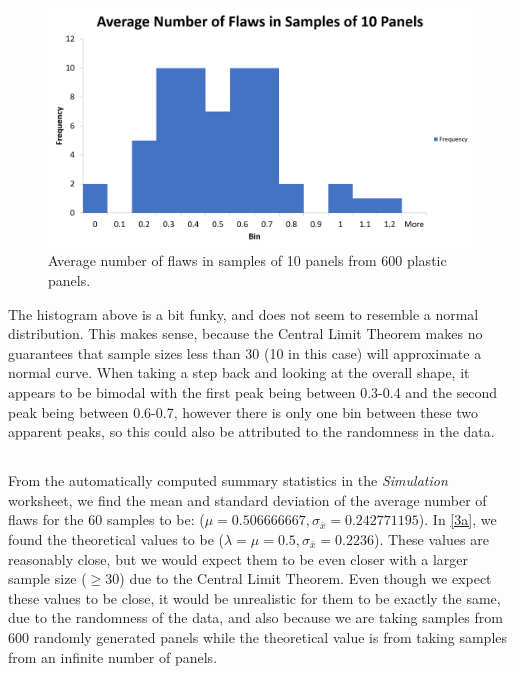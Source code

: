 \documentclass[letterpaper]{article}
\begin{document}
\subsection{}%
\label{4c}
\begin{figure}[H]
 \centering
 \includegraphics[width=\textwidth]{q4.png}
 \caption{Average number of flaws in samples of 10 panels from 600 plastic panels.}
 
\end{figure}

The histogram above is a bit funky, and does not seem to resemble a normal
distribution.  This makes sense, because the Central Limit Theorem makes no
guarantees that sample sizes less than 30  (10 in this case) will approximate a
normal curve. When taking a step back and looking at the overall shape, it
appears to be bimodal with the first peak being between 0.3-0.4 and the second
peak being between 0.6-0.7, however there is only one bin between these two
apparent peaks, so this could also be attributed to the randomness in the data.

\subsection{}%

\label{4d}
From the automatically computed summary statistics in the \textit{Simulation}
worksheet, we find the mean and standard deviation of the average number of
flaws for the 60 samples to be: ($\mu=0.506666667,
 \sigma_{\bar{x}}=0.242771195$). In \ref{3a}, we found the theoretical values to
be ($\lambda=\mu=0.5, \sigma_{\bar{x}}=0.2236$). These values are reasonably
close, but we would expect them to be even closer with a larger sample size
($\geq 30$) due to the Central Limit Theorem. Even though we expect these values
to be close, it would be unrealistic for them to be exactly the same, due to the
randomness of the data, and also because we are taking samples from 600 randomly
generated panels while the theoretical value is from taking samples from an
infinite number of panels.
\end{document}
